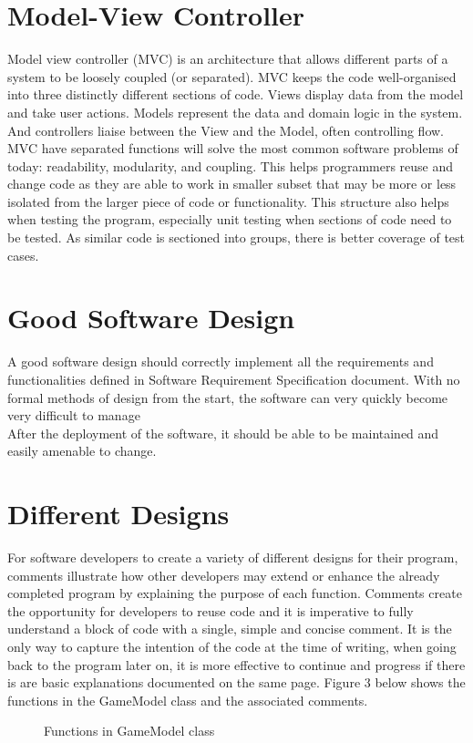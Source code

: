 \documentclass[12pt, a4]{report}
\begin{document}
	\section{Model-View Controller}
	\par Model view controller (MVC) is an architecture that allows different parts of a system to be loosely coupled (or separated). MVC keeps the code well-organised into three distinctly different sections of code. Views display data from the model and take user actions. Models represent the data and domain logic in the system. And controllers liaise between the View and the Model, often controlling flow. MVC have separated functions will solve the most common software problems of today: readability, modularity, and coupling. This helps programmers reuse and change code as they are able to work in smaller subset that may be more or less isolated from the larger piece of code or functionality. This structure also helps when testing the program, especially unit testing when sections of code need to be tested. As similar code is sectioned into groups, there is better coverage of test cases. 
	
	\section{Good Software Design}
	A good software design should correctly implement all the requirements and functionalities defined in Software Requirement Specification document. With no formal methods of design from the start, the software can very quickly become very difficult to manage
	\\
	After the deployment of the software, it should be able to be maintained and easily amenable to change. 
	
	
	\section{Different Designs}
	\par For software developers to create a variety of different designs for their program, comments illustrate how other developers may extend or enhance the already completed program by explaining the purpose of each function. Comments create the opportunity for developers to reuse code and it is imperative to fully understand a block of code with a single, simple and concise comment. It is the only way to capture the intention of the code at the time of writing, when going back to the program later on, it is more effective to continue and progress if there is are basic explanations documented on the same page. Figure 3 below shows the functions in the GameModel class and the associated comments.
	
	\begin{figure}[h]
		
		\caption{Functions in GameModel class}
	\end{figure}
	
	
	
\end{document}
